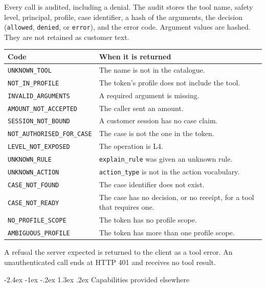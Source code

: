\documentclass[11pt,a4paper]{article}
\makeatletter
\renewcommand\section{%
  \@startsection{section}{1}{\z@}%
    {-2.4ex \@plus -1ex \@minus -.2ex}%
    {1.3ex \@plus .2ex}%
    {\Large\sffamily\bfseries\color{hcNavy}}%
}
\newcommand{\tool}[1]{\texttt{#1}}
\newcommand{\code}[1]{\texttt{#1}}
\makeatother
\begin{document}
Every call is audited, including a denial. The audit stores the tool name, safety level, principal, profile, case identifier, a hash of the arguments, the decision (\code{allowed}, \code{denied}, or \code{error}), and the error code. Argument values are hashed. They are not retained as customer text.

\begin{center}
\small
\begin{tabularx}{\textwidth}{@{}lX@{}}
\toprule
\textbf{Code} & \textbf{When it is returned} \\
\midrule
\code{UNKNOWN\_TOOL} & The name is not in the catalogue. \\
\code{NOT\_IN\_PROFILE} & The token's profile does not include the tool. \\
\code{INVALID\_ARGUMENTS} & A required argument is missing. \\
\code{AMOUNT\_NOT\_ACCEPTED} & The caller sent an amount. \\
\code{SESSION\_NOT\_BOUND} & A customer session has no case claim. \\
\code{NOT\_AUTHORISED\_FOR\_CASE} & The case is not the one in the token. \\
\code{LEVEL\_NOT\_EXPOSED} & The operation is L4. \\
\code{UNKNOWN\_RULE} & \tool{explain\_rule} was given an unknown rule. \\
\code{UNKNOWN\_ACTION} & \code{action\_type} is not in the action vocabulary. \\
\code{CASE\_NOT\_FOUND} & The case identifier does not exist. \\
\code{CASE\_NOT\_READY} & The case has no decision, or no receipt, for a tool that requires one. \\
\code{NO\_PROFILE\_SCOPE} & The token has no profile scope. \\
\code{AMBIGUOUS\_PROFILE} & The token has more than one profile scope. \\
\bottomrule
\end{tabularx}
\end{center}

A refusal the server expected is returned to the client as a tool error. An unauthenticated call ends at HTTP 401 and receives no tool result.

\section{Capabilities provided elsewhere}
\label{sec:outside}
\end{document}
